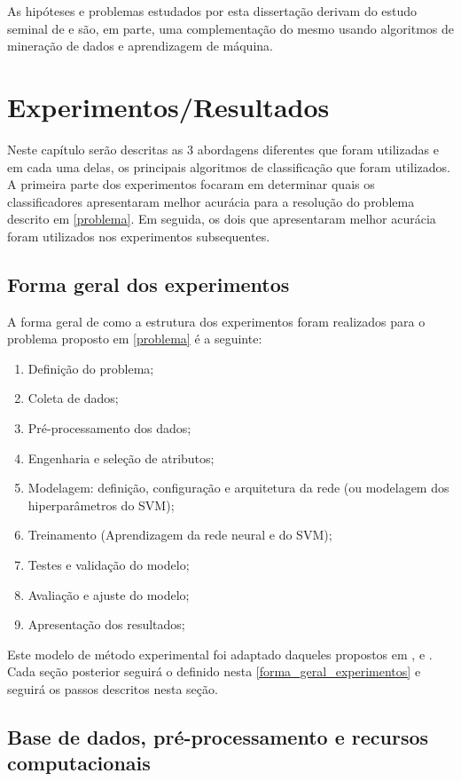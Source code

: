 As hipóteses e problemas estudados por esta dissertação derivam do estudo seminal de \cite{sarkis2017} e são, em parte, uma complementação do mesmo usando algoritmos de mineração de dados e aprendizagem de máquina.

\chapter{Experimentos/Resultados}\label{resultados}
Neste capítulo serão descritas as 3 abordagens diferentes que foram utilizadas e em cada uma delas, os principais algoritmos de classificação que foram utilizados. A primeira parte dos experimentos focaram em determinar quais os classificadores apresentaram melhor acurácia para a resolução do problema descrito em \ref{problema}. Em seguida, os dois que apresentaram melhor acurácia foram utilizados nos experimentos subsequentes.

\section{Forma geral dos experimentos}\label{forma_geral_experimentos}
A forma geral de como a estrutura dos experimentos foram realizados para o problema proposto em \ref{problema} é a seguinte:
\begin{enumerate}
	\item Definição do problema;
	\item Coleta de dados;
	\item Pré-processamento dos dados;
	\item Engenharia e seleção de atributos;
	\item Modelagem: definição, configuração e arquitetura da rede (ou modelagem dos hiperparâmetros do SVM);
	\item Treinamento (Aprendizagem da rede neural e do SVM);
	\item Testes e validação do modelo;
		\item Avaliação e ajuste do modelo;
	\item Apresentação dos resultados;
\end{enumerate}

Este modelo de método experimental foi adaptado daqueles propostos em \cite{lima_ia_2016}, \cite{silva_redes_2016} e \cite{haykin_redes_2001}. Cada seção posterior seguirá o definido nesta \autoref{forma_geral_experimentos} e seguirá os passos descritos nesta seção.

\section{Base de dados, pré-processamento e recursos computacionais}\label{base_dados}
